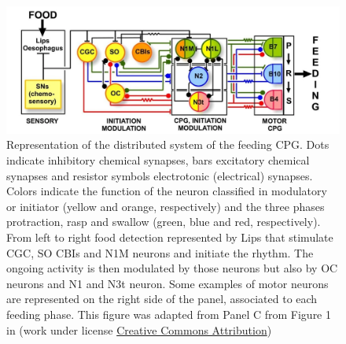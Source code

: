 \begin{figure}[bth!]
	\centering
	\includegraphics[width=\textwidth]{img/invariants/distributed_benjamin_2012.png}
	\caption{Representation of the distributed system of the feeding CPG. Dots indicate inhibitory chemical synapses, bars excitatory chemical synapses and resistor symbols electrotonic (electrical) synapses. Colors indicate the function of the neuron classified in modulatory or initiator (yellow and orange, respectively) and the three phases protraction, rasp and swallow (green, blue and red, respectively). From left to right food detection represented by Lips that stimulate CGC, SO CBIs and N1M neurons and initiate the rhythm. The ongoing activity is then modulated by those neurons but also by OC neurons and N1 and N3t neuron. Some examples of motor neurons are represented on the right side of the panel, associated to each feeding phase. This figure was adapted from Panel C from Figure 1 in \textcite{benjamin_distributed_2012} (work under license \href{http://creativecommons.org/licenses/by/2.0}{Creative Commons Attribution})}
	\label{fig:feeding distribution}%
\end{figure}


